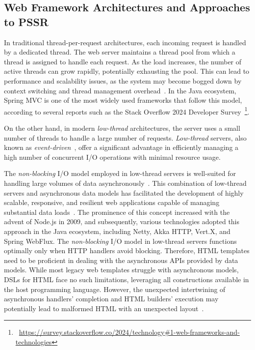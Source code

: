 \subsection{Web Framework Architectures and Approaches to PSSR}
\label{sec:web-frameworks}

In traditional thread-per-request architectures, each incoming request is
handled by a dedicated thread. The web server maintains a thread pool from
which a thread is assigned to handle each request. As the load increases, the
number of active threads can grow rapidly, potentially exhausting the pool.
This can lead to performance and scalability issues, as the system may become
bogged down by context switching and thread management
overhead~\cite{kant2000scalable}. In the Java ecosystem, Spring MVC is one of
the most widely used frameworks that follow this model, according to several
reports such as the Stack Overflow 2024 Developer
Survey~\footnote{~\url{https://survey.stackoverflow.co/2024/technology\#1-web-frameworks-and-technologies}}.

On the other hand, in modern \textit{low-thread} architectures, the server uses
a small number of threads to handle a large number of requests.
\textit{Low-thread} servers, also known as
\textit{event-driven}~\cite{event-driven-servers}, offer a significant
advantage in efficiently managing a high number of concurrent I/O operations
with minimal resource usage.

The \textit{non-blocking} I/O model employed in low-thread servers is
well-suited for handling large volumes of data asynchronously~\cite{Meijer12}.
This combination of low-thread servers and asynchronous data models has
facilitated the development of highly scalable, responsive, and resilient web
applications capable of managing substantial data loads~\cite{Jin15}. The
prominence of this concept increased with the advent of Node.js in 2009, and
subsequently, various technologies adopted this approach in the Java ecosystem,
including Netty, Akka HTTP, Vert.X, and Spring WebFlux.
The \textit{non-blocking} I/O model in low-thread servers functions optimally
only when HTTP handlers avoid blocking. Therefore, HTML templates need to be
proficient in dealing with the asynchronous APIs provided by data models. While
most legacy web templates struggle with asynchronous models, DSLs for HTML face
no such limitations, leveraging all constructions available in the host
programming language. However, the unexpected intertwining of asynchronous
handlers' completion and HTML builders' execution may potentially lead to
malformed HTML with an unexpected layout~\cite{wise2024pssr}.

